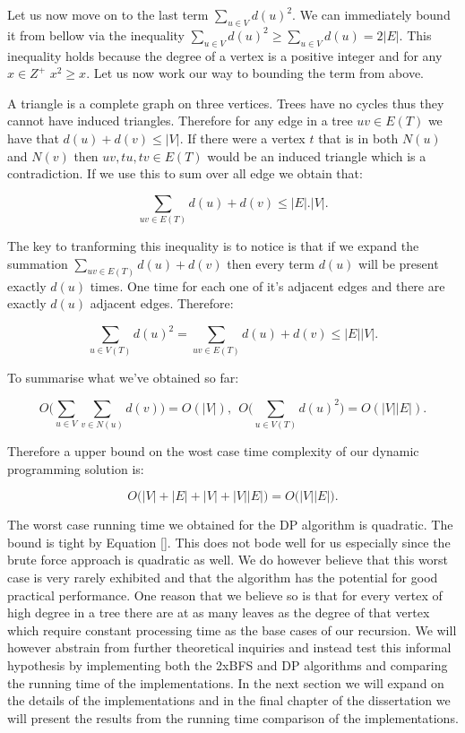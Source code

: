 Let us now move on to the last term $\sum_{u \in V}{d(u)^2}$. We can immediately bound it from bellow via the inequality $ \sum_{u \in V}{d(u)^2} \ge \sum_{u \in V}{d(u)} = 2|E|$. This inequality holds because the degree of a vertex is a positive integer and for any $x \in Z^+$ $ x^2 \ge x$. Let us now work our way to bounding the term from above.

A triangle is a complete graph on three vertices. Trees have no cycles thus they cannot have induced triangles. Therefore for any edge in a tree $uv \in E(T)$ we have that $d(u) + d(v) \le |V|$. If there were a vertex $t$ that is in both $N(u)$ and $N(v)$ then $uv, tu, tv \in E(T)$ would be an induced triangle which is a contradiction. If we use this to sum over all edge we obtain that:

$$ \sum_{uv \in E(T)}{d(u) + d(v)} \le |E|.|V|. $$

The key to tranforming this inequality is to notice is that if we expand the summation $\sum_{uv \in E(T)}{d(u) + d(v)}$ then every term $d(u)$ will be present exactly $d(u)$ times. One time for each one of it's adjacent edges and there are exactly $d(u)$ adjacent edges. Therefore:

$$ \sum_{u \in V(T)}{d(u)^2} = \sum_{uv \in E(T)}{d(u) + d(v)} \le |E||V| .$$

To summarise what we've obtained so far:

$$ O\bigg( \sum_{u \in V}{\sum_{v \in N(u)}{d(v)}} \bigg) = O(|V|)  , ~~ O\bigg( \sum_{u \in V(T)}{d(u)^2} \bigg) = O(|V||E|).$$

Therefore a upper bound on the wost case time complexity of our dynamic programming solution is:

$$ O\big( |V| + |E| + |V| + |V||E|  \big) = O\big(|V||E|\big).$$

The worst case running time we obtained for the DP algorithm is quadratic. The bound is tight by Equation []. This does not bode well for us especially since the brute force approach is quadratic as well. We do however believe that this worst case is very rarely exhibited and that the algorithm has the potential for good practical performance. One reason that we believe so is that for every vertex of high degree in a tree there are at as many leaves as the degree of that vertex which require constant processing time as the base cases of our recursion. We will however abstrain from further theoretical inquiries and instead test this informal hypothesis by implementing both the 2xBFS and DP algorithms and comparing the running time of the implementations. In the next section we will expand on the details of the implementations and in the final chapter of the dissertation we will present the results from the running time comparison of the implementations.


